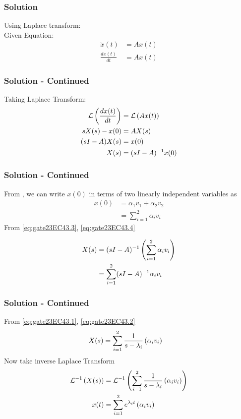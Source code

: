 \documentclass{beamer}
\begin{document}
\begin{frame}
\frametitle{Solution}
Using Laplace transform: \\
Given Equation:
\begin{align}
\dot{{x}}(t) &= A{x}(t) \\
\frac{d{x}(t)}{dt} &= A{x}(t) 
\end{align}
\end{frame}

\begin{frame}
\frametitle{Solution - Continued}
Taking Laplace Transform:
\begin{align}
\mathcal{L}\left(\frac{d{x}(t)}{dt}\right) &= \mathcal{L}\left(A{x}(t)\right) \\
sX(s) - {x}(0) &= AX(s) \\
(sI - A)X(s) &= x(0) \\
X(s) &= (sI - A)^{-1}{x}(0) \label{eq:gate23EC43.3}
\end{align}
\end{frame}

\begin{frame}
\frametitle{Solution - Continued}
From , we can write $x(0)$ in terms of two linearly independent variables as 
\begin{align}
    x(0) &= \alpha_1v_1 + \alpha_2v_2 \\
    &= \sum_{i=1}^{2}\alpha_iv_i \label{eq:gate23EC43.4}
\end{align}
From \eqref{eq:gate23EC43.3}, \eqref{eq:gate23EC43.4}

\begin{align}
 X(s) &= (sI - A)^{-1}\left(\sum_{i=1}^{2}\alpha_iv_i\right) \\
 &= \sum_{i=1}^{2}(sI - A)^{-1}\alpha_iv_i
\end{align}
\end{frame}

\begin{frame}
\frametitle{Solution - Continued}
From \eqref{eq:gate23EC43.1}, \eqref{eq:gate23EC43.2}
\begin{align}
X(s) &=  \sum_{i=1}^{2}\frac{1}{s-\lambda_i}\left(\alpha_iv_i\right) 
\end{align}
Now take inverse Laplace Transform
\begin{align}
\mathcal{L}^{-1}\left(X(s)\right) &= \mathcal{L}^{-1}\left(\sum_{i=1}^{2}\frac{1}{s-\lambda_i}\left(\alpha_iv_i\right)\right) \\
{x}(t) &= \sum_{i=1}^{2} e^{\lambda_it}\left(\alpha_iv_i\right) 
\end{align}
\end{frame}
\end{document}
